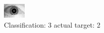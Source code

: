 \begin{figure}[h!]
\begin{center}
\includegraphics[width=0.60\columnwidth]{figures/ID1642_class_3_target_2.png}
\end{center}
\caption{ Classification: 3 actual target: 2}
\label{fig:ID1642_class_3_target_2}
\end{figure}
